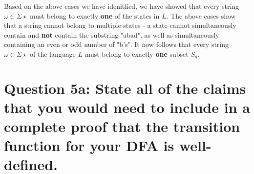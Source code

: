 \documentclass{article}
\begin{document}
\noindent
Based on the above cases we have idenitfied, we have showed that every string $\omega \in \Sigma \star$ must belong to exactly \textbf{one} of the states in $L$. The above cases show that a string cannot 
belong to multiple states - a state cannot simultaneously contain and \textbf{not} contain the substring "abad", as well as simultaneously containing an even or odd number of "b's". It now follows that every 
string $\omega\in\Sigma\star$ of the language $L$ must belong to exactly \textbf{one} subset $S_q$. 
\newpage

\section*{Question 5a: State all of the claims that you would need to include in a complete proof that the transition function for your DFA is well-defined.}
\end{document}
